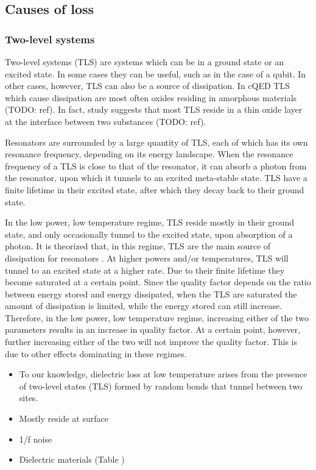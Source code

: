 \documentclass[12pt]{report}
\begin{document}
\subsection{Causes of loss}

\subsubsection{Two-level systems}
\label{sec:TLS}
Two-level systems (TLS) are systems which can be in a ground state or an excited state. In some cases they can be useful, such as in the case of a qubit. In other cases, however, TLS can also be a source of dissipation. In cQED TLS which cause dissipation are most often oxides residing in amorphous materials (TODO: ref). In fact, study suggests that most TLS reside in a thin oxide layer at the interface between two substances (TODO: ref).

Resonators are surrounded by a large quantity of TLS, each of which has its own resonance frequency, depending on its energy landscape. When the resonance frequency of a TLS is close to that of the resonator, it can absorb a photon from the resonator, upon which it tunnels to an excited meta-stable state. TLS have a finite lifetime in their excited state, after which they decay back to their ground state.

In the low power, low temperature regime, TLS reside mostly in their ground state, and only occasionally tunnel to the excited state, upon absorption of a photon. It is theorized that, in this regime, TLS are the main source of dissipation for resonators \cite{gao2008experimental}. At higher powers and/or temperatures, TLS will tunnel to an excited state at a higher rate. Due to their finite lifetime they become saturated at a certain point. Since the quality factor depends on the ratio between energy stored and energy dissipated, when the TLS are saturated the amount of dissipation is limited, while the energy stored can still increase. Therefore, in the low power, low temperature regime, increasing either of the two parameters results in an increase in quality factor. At a certain point, however, further increasing either of the two will not improve the quality factor. This is due to other effects dominating in these regimes.

\begin{itemize}
    \item To our knowledge, dielectric loss at low temperature
        arises from the presence of two-level states (TLS) formed
        by random bonds that tunnel between two sites. \cite{martinis2014ucsb}
    \item Mostly reside at surface \cite{gao2008experimental}
    \item 1/f noise \cite{burnett2013evidence}
    \item Dielectric materials (Table \cite{martinis2014ucsb})
\end{itemize}
\end{document}
